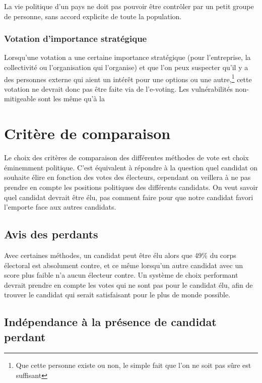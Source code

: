 \documentclass[../report]{subfiles}
\begin{document}
La vie politique d'un pays ne doit pas pouvoir être contrôler par un petit groupe de personne, sans accord 
explicite de toute la population.

\subsection{Votation d'importance stratégique}
Lorsqu'une votation a une certaine importance stratégique (pour l'entreprise, la collectivité ou l'organisation qui l'organise)
et que l'on peux suspecter qu'il y a des personnes externe qui aient un intérêt pour une options ou une 
autre,\footnote{Que cette personne existe ou non, le simple fait que l'on ne soit pas sûre est suffisant}
cette votation ne devrait donc pas être faite via de l'e-voting. 
Les vulnérabilités non-mitigeable sont les même qu'à la 

  \chapter{Critère de comparaison}
  

  Le choix des critères de comparaison des différentes méthodes de vote est choix 
  éminemment politique.
  C'est équivalent à répondre à la question quel candidat on souhaite élire en fonction
  des votes des électeurs, cependant on veillera à ne pas prendre en compte les positions 
  politiques des différents candidats.
  On veut savoir quel candidat devrait être élu, pas comment faire pour que notre candidat 
  favori l'emporte face aux autres candidats.

  \section{Avis des perdants}

  Avec certaines méthodes, un candidat peut être élu alors que 49\% du corps électoral est
  absolument contre, et ce même lorsqu'un autre candidat avec un score plus faible n'a aucun
  électeur contre.
  Un système de choix performant devrait prendre en compte les votes qui ne sont pas pour le candidat
  élu, afin de trouver le candidat qui serait satisfaisant pour le plus de monde possible.

  
  \section{Indépendance à la présence de candidat perdant}
\end{document}

